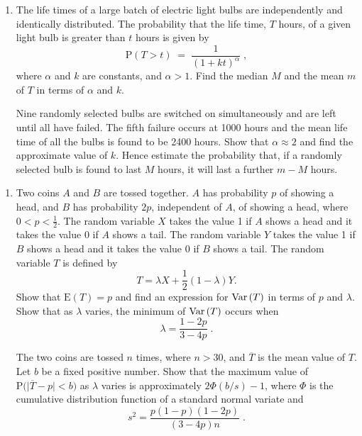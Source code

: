 \documentclass[a4, 11pt]{report}
\newlength{\qspace}
\newcounter{qnumber}
\newenvironment{question}%
 {\vspace{\qspace}
  \begin{enumerate}[\bfseries 1\quad][10]%
    \setcounter{enumi}{\value{qnumber}}%
    \item%
 }
{
  \end{enumerate}
  \filbreak
  \stepcounter{qnumber}
 }
\def\E{{\mathrm E}}
\def\P{{\mathrm P}}
\def\var{{\rm Var}\,}
\begin{document}
\begin{question}
The life times of a large batch of electric light bulbs are independently
and identically distributed. The probability that the life time, $T$ hours, of a 
given light bulb is greater than $t$ hours is given by
\[
\P(T>t) \; = \; \frac{1}{(1+kt)^\alpha}\;,
\]
where $\alpha$ and $k$ are constants, and $\alpha >1$. 
Find the median $M$ and the mean $m$ of $T$ in terms of $\alpha$ and $k$.

Nine randomly selected bulbs are switched on simultaneously and are left until all have failed.
The fifth failure occurs at 1000 hours and the mean life time of all the bulbs is found 
to be 2400 hours. Show that $\alpha\approx2$
and find the approximate value of $k$.
Hence estimate the 
probability that, if a randomly selected bulb is found to last $M$ hours, it will
last a further $m-M$ hours.
\end{question}

\begin{question}
Two coins $A$ and $B$ are tossed together. $A$ has  
probability $p$ of showing a head, and $B$ has probability $2p$, independent of $A$,
of showing a head,
where $0<p<\frac12$.
The random variable $X$ takes the value 1 if $A$ 
shows a head and it takes the value $0$  if $A$ shows a tail. 
The random variable $Y$ takes the value 1 if $B$ 
shows a head and it takes the value $0$  if $B$ shows a tail.
The random variable $T$ is defined by
\[
T= \lambda X + {\textstyle\frac12} (1-\lambda)Y.
\]
Show that $\E(T)=p$ and find an expression for $\var(T)$ in terms of $p$ and $\lambda$.
Show that as $\lambda$ varies, the minimum of $\var(T)$ occurs when 
\[
\lambda =\frac{1-2p}{3-4p}\;.
\]

The two coins are tossed $n$ times, where $n>30$, and $\overline{T}$ is the mean value of $T$.
Let $b$ be a fixed positive number. Show that the maximum value of 
$\P\big(\vert \overline{T}-p\vert<b\big)$ as $\lambda$ varies is approximately $2\Phi(b/s)-1$,
 where $\Phi$ is the cumulative distribution function of a standard normal variate and 
\[
s^2= \frac{p(1-p)(1-2p)}{(3-4p)n}\;.
\]
\end{question}
	
\end{document}

